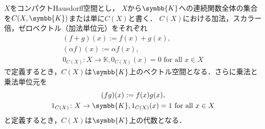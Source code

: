 \documentclass[../main.tex]{subfiles}
\begin{document}
\nocite{miyajima-functional-analysis}

\begin{thmbox}
\begin{proposition}
\(X\)をコンパクトHausdorff空間とし，
\(X\)から\(\symbb{K}\)への連続関数全体の集合を\(C(X, \symbb{K})\)または単に\(C(X)\)と書く．
\(C(X)\)における加法，スカラー倍，ゼロベクトル（加法単位元）をそれぞれ
\begin{gather*}
    (f + g)(x) := f(x) + g(x),\\
    (\alpha f)(x) := \alpha f(x), \\
    0_{C(X)} \colon X \to \mathbb{K}, \text{\(0_{C(X)} (x) = 0\)  for all \(x \in X
\)}
\end{gather*}
で定義するとき，\(C(X)\)は\(\symbb{K}\)上のベクトル空間となる．さらに乗法と乗法単位元を
\begin{gather*}
    (fg)(x) := f(x)g(x), \\
    1_{C(X)} \colon X \to \symbb{K},\text{\(1_{C(X)}(x) = 1\) for all \(x \in X\)}
\end{gather*}
と定義するとき，\(C(X)\)は\(\symbb{K}\)上の代数となる．
\end{proposition}
\end{thmbox}
\end{document}
